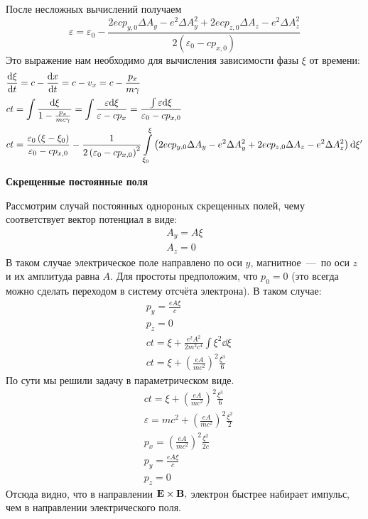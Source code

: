 \documentclass[10pt, a4paper]{article}
\begin{document}
После несложных вычислений получаем
\begin{equation*}
    \varepsilon = \varepsilon_0 - \frac{2ecp_{y,0}\Delta A_y - e^2\Delta A_y^2 + 2ecp_{z,0}\Delta A_z - e^2\Delta A_z^2}{2\left( \varepsilon_0 - cp_{x,0} \right)}
\end{equation*}
Это выражение нам необходимо для вычисления зависимости фазы $\xi$ от времени:
\begin{align*}
	&\dv{\xi}{t} = c - \dv{x}{t} = c - v_x = c - \frac{p_x}{m\gamma} \\
	&ct = \int\frac{\dd\xi}{1 - \frac{p_x}{mc\gamma}} = \int\frac{\varepsilon\dd\xi}{\varepsilon-cp_x} = \frac{\int\varepsilon\dd\xi}{\varepsilon_0-cp_{x,0}}\\
	&ct = \frac{\varepsilon_0\left( \xi-\xi_0 \right)}{ \varepsilon_0 - cp_{x,0}}-\frac{1}{2\left( \varepsilon_0 - cp_{x,0} \right)^2}\int\limits_{\xi_0}^{\xi}\left( 2ecp_{y,0}\Delta A_y - e^2\Delta A_y^2 + 2ecp_{z,0}\Delta A_z - e^2\Delta A_z^2 \right)\dd\xi'
\end{align*}

\vspace{5mm}
\textbf{Скрещенные постоянные поля}

Рассмотрим случай постоянных однороных скрещенных полей, чему соответствует вектор потенциал в виде:
\begin{align*}
	A_y = A\xi \\
	A_z = 0
\end{align*}
В таком случае электрическое поле направлено по оси $y$, магнитное~---~по оси $z$ и их амплитуда равна $A$. Для простоты предположим, что $p_0=0$ (это всегда можно сделать переходом в систему отсчёта электрона). В таком случае:
\begin{align*}
	&p_y = \frac{eA\xi}{c} \\
	&p_z = 0 \\
	&ct = \xi + \frac{e^2A^2}{2m^2c^4}\int\limits {\xi}^2\dd\xi \\
	&ct = \xi + \left( \frac{e A}{mc^2} \right)^2 \frac{\xi^3}{6}
\end{align*}
По сути мы решили задачу в параметрическом виде.
\begin{align*}
	& ct = \xi + \left( \frac{e A}{mc^2} \right)^2 \frac{\xi^3}{6} \\
	& \varepsilon = mc^2 + \left( \frac{e A}{mc^2} \right)^2\frac{\xi^2}{2} \\
	& p_x = \left( \frac{e A}{mc^2} \right)^2\frac{\xi^2}{2c} \\
	& p_y = \frac{eA\xi}{c} \\
	& p_z = 0 
\end{align*}
Отсюда видно, что в направлении $\vb{E}\times\vb{B} ,$ электрон быстрее набирает импульс, чем в направлении электрического поля.
\end{document}
